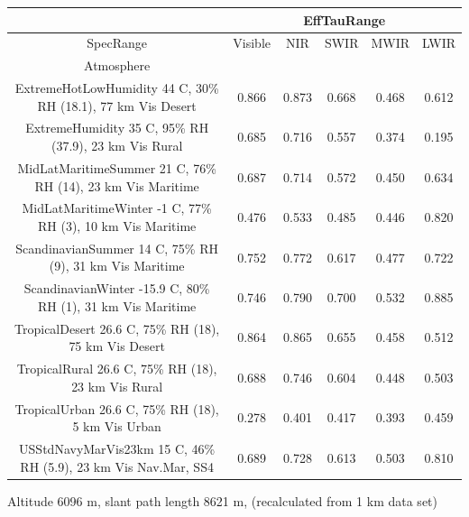 \documentclass{workpackage}
\begin{document}
\begin{center}

\begin{footnotesize}

\begin{tabular}{|c|c|c|c|c|c|}
\hline
&\multicolumn{5}{|c|}{EffTauRange}\\\hline
SpecRange&Visible&NIR&SWIR&MWIR&LWIR\\\hline
Atmosphere&&&&&\\\hline
ExtremeHotLowHumidity 44 C, 30\% RH (18.1), 77 km Vis Desert&0.866&0.873&0.668&0.468&0.612\\\hline
ExtremeHumidity 35 C, 95\% RH (37.9), 23 km Vis Rural&0.685&0.716&0.557&0.374&0.195\\\hline
MidLatMaritimeSummer 21 C, 76\% RH (14), 23 km Vis Maritime&0.687&0.714&0.572&0.450&0.634\\\hline
MidLatMaritimeWinter -1 C, 77\% RH (3), 10 km Vis Maritime&0.476&0.533&0.485&0.446&0.820\\\hline
ScandinavianSummer 14 C, 75\% RH (9), 31 km Vis Maritime&0.752&0.772&0.617&0.477&0.722\\\hline
ScandinavianWinter -15.9 C, 80\% RH (1), 31 km Vis Maritime&0.746&0.790&0.700&0.532&0.885\\\hline
TropicalDesert 26.6 C, 75\% RH (18), 75 km Vis Desert&0.864&0.865&0.655&0.458&0.512\\\hline
TropicalRural 26.6 C, 75\% RH (18), 23 km Vis Rural&0.688&0.746&0.604&0.448&0.503\\\hline
TropicalUrban 26.6 C, 75\% RH (18), 5 km Vis Urban&0.278&0.401&0.417&0.393&0.459\\\hline
USStdNavyMarVis23km 15 C, 46\% RH (5.9), 23 km Vis Nav.Mar, SS4&0.689&0.728&0.613&0.503&0.810\\\hline

\end{tabular}
\end{footnotesize}
\end{center}



Altitude 6096 m, slant path length 8621 m, (recalculated from 1 km data set)
\end{document}
